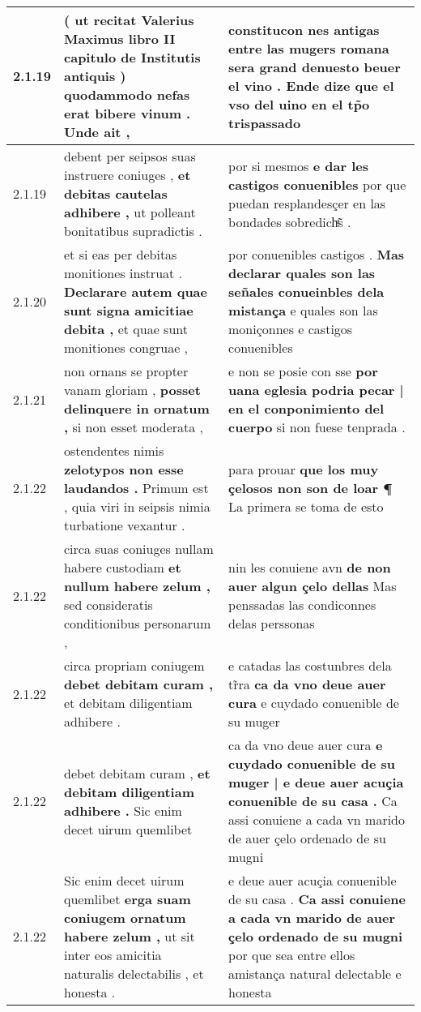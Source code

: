 \begin{tabular}{|p{1cm}|p{6.5cm}|p{6.5cm}|}
2.1.19 & ( ut recitat Valerius Maximus libro II capitulo de Institutis antiquis ) \textbf{ quodammodo nefas erat bibere vinum . } Unde ait , & constitucon nes antigas entre las mugers romana \textbf{ sera grand denuesto beuer el vino . } Ende dize que el vso del uino en el tp̃o trispassado \\\hline
2.1.19 & debent per seipsos suas instruere coniuges , \textbf{ et debitas cautelas adhibere , } ut polleant bonitatibus supradictis . & por si mesmos \textbf{ e dar les castigos conuenibles } por que puedan resplandesçer en las bondades sobredichͣ̃s . \\\hline
2.1.20 & et si eas per debitas monitiones instruat . \textbf{ Declarare autem quae sunt signa amicitiae debita , } et quae sunt monitiones congruae , & por conuenibles castigos . \textbf{ Mas declarar quales son las señales conueinbles dela mistança } e quales son las moniçonnes e castigos conuenibles \\\hline
2.1.21 & non ornans se propter vanam gloriam , \textbf{ posset delinquere in ornatum , } si non esset moderata , & e non se posie con sse \textbf{ por uana eglesia podria pecar | en el conponimiento del cuerpo } si non fuese tenprada . \\\hline
2.1.22 & ostendentes nimis \textbf{ zelotypos non esse laudandos . } Primum est , quia viri in seipsis nimia turbatione vexantur . & para prouar \textbf{ que los muy çelosos non son de loar ¶ } La primera se toma de esto \\\hline
2.1.22 & circa suas coniuges nullam habere custodiam \textbf{ et nullum habere zelum , } sed consideratis conditionibus personarum , & nin les conuiene avn \textbf{ de non auer algun çelo dellas } Mas penssadas las condiconnes delas perssonas \\\hline
2.1.22 & circa propriam coniugem \textbf{ debet debitam curam , } et debitam diligentiam adhibere . & e catadas las costunbres dela tr̃ra \textbf{ ca da vno deue auer cura } e cuydado conuenible de su muger \\\hline
2.1.22 & debet debitam curam , \textbf{ et debitam diligentiam adhibere . } Sic enim decet uirum quemlibet & ca da vno deue auer cura \textbf{ e cuydado conuenible de su muger | e deue auer acuçia conuenible de su casa . } Ca assi conuiene a cada vn marido de auer çelo ordenado de su mugni \\\hline
2.1.22 & Sic enim decet uirum quemlibet \textbf{ erga suam coniugem ornatum habere zelum , } ut sit inter eos amicitia naturalis delectabilis , et honesta . & e deue auer acuçia conuenible de su casa . \textbf{ Ca assi conuiene a cada vn marido de auer çelo ordenado de su mugni } por que sea entre ellos amistança natural delectable e honesta \\\hline

\end{tabular}
